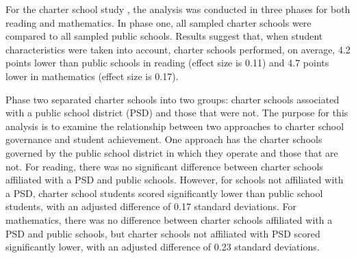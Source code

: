 \documentclass[letterpaper,12p,twoside]{article} %
\begin{document}

For the charter school study \cite{BraunJenkinsGrigg2006}, the analysis was conducted in three phases for both reading and mathematics. In phase one, all sampled charter schools were compared to all sampled public schools. Results suggest that, when student characteristics were taken into account, charter schools performed, on average, 4.2 points lower than public schools in reading (effect size is 0.11) and 4.7 points lower in mathematics (effect size is 0.17).

Phase two separated charter schools into two groups: charter schools associated with a public school district (PSD) and those that were not. The purpose for this analysis is to examine the relationship between two approaches to charter school governance and student achievement. One approach has the charter schools governed by the public school district in which they operate and those that are not. For reading, there was no significant difference between charter schools affiliated with a PSD and public schools. However, for schools not affiliated with a PSD, charter school students scored significantly lower than public school students, with an adjusted difference of 0.17 standard deviations. For mathematics, there was no difference between charter schools affiliated with a PSD and public schools, but charter schools not affiliated with PSD scored significantly lower, with an adjusted difference of 0.23 standard deviations.
\end{document}
